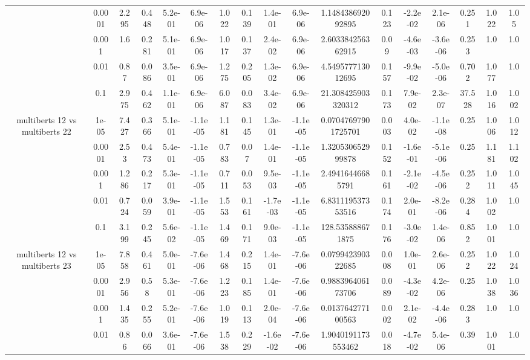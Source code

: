 \begin{tabular}{|c|c|c|c|c|c|c|c|c|c|c|c|c|c|c|c|c|}
 & 0.0001 & 2.295 & 0.448 & 5.2e-01 & 6.9e-06 & 1.022 & 0.139 & 1.4e-01 & 6.9e-06 & 1.148438692092895 & 0.123 & -2.2e-02 & 2.1e-06 & 0.251 & 1.022 & 1.05 \\
 & 0.001 & 1.6 & 0.281 & 5.1e-01 & 6.9e-06 & 1.017 & 0.137 & 2.4e-02 & 6.9e-06 & 2.603384256362915 & 0.09 & -4.6e-03 & -3.6e-06 & 0.253 & 1.0 & 1.0 \\
 & 0.01 & 0.87 & 0.086 & 3.5e-01 & 6.9e-06 & 1.275 & 0.205 & 1.3e-02 & 6.9e-06 & 4.549577713012695 & 0.157 & -9.9e-02 & -5.0e-06 & 0.702 & 1.077 & 1.0 \\
 & 0.1 & 2.975 & 0.462 & 1.1e-01 & 6.9e-06 & 6.087 & 0.083 & 3.4e-02 & 6.9e-06 & 21.308425903320312 & 0.173 & 7.9e-02 & 2.3e-07 & 37.528 & 1.016 & 1.002 \\
\hline
\multirow{5}{*}{multiberts 12 vs multiberts 22} & 1e-05 & 7.427 & 0.366 & 5.1e-01 & -1.1e-05 & 1.181 & 0.145 & 1.3e-01 & -1.1e-05 & 0.07047697901725701 & 0.003 & 4.0e-02 & -1.1e-08 & 0.25 & 1.006 & 1.012 \\
 & 0.0001 & 2.53 & 0.473 & 5.4e-01 & -1.1e-05 & 0.783 & 0.07 & 1.4e-01 & -1.1e-05 & 1.320530652999878 & 0.152 & -1.6e-01 & -5.1e-06 & 0.25 & 1.181 & 1.102 \\
 & 0.001 & 1.286 & 0.217 & 5.3e-01 & -1.1e-05 & 0.711 & 0.053 & 9.5e-03 & -1.1e-05 & 2.49416446685791 & 0.161 & -2.1e-02 & -4.5e-06 & 0.252 & 1.011 & 1.045 \\
 & 0.01 & 0.724 & 0.059 & 3.9e-01 & -1.1e-05 & 1.553 & 0.161 & -1.7e-03 & -1.1e-05 & 6.831119537353516 & 0.174 & 2.0e-01 & -8.2e-06 & 0.284 & 1.002 & 1.0 \\
 & 0.1 & 3.199 & 0.245 & 5.6e-02 & -1.1e-05 & 1.469 & 0.171 & 9.0e-03 & -1.1e-05 & 128.535888671875 & 0.176 & -3.0e-02 & 1.4e-06 & 0.852 & 1.001 & 1.0 \\
\hline
\multirow{5}{*}{multiberts 12 vs multiberts 23} & 1e-05 & 7.858 & 0.461 & 5.0e-01 & -7.6e-06 & 1.468 & 0.215 & 1.4e-01 & -7.6e-06 & 0.079942390322685 & 0.008 & 1.0e-01 & 2.6e-06 & 0.252 & 1.022 & 1.024 \\
 & 0.0001 & 2.956 & 0.58 & 5.3e-01 & -7.6e-06 & 1.223 & 0.185 & 1.4e-01 & -7.6e-06 & 0.988396406173706 & 0.089 & -4.3e-02 & 4.2e-06 & 0.25 & 1.038 & 1.036 \\
 & 0.001 & 1.435 & 0.255 & 5.2e-01 & -7.6e-06 & 1.019 & 0.113 & 2.0e-04 & -7.6e-06 & 0.013764277100563 & 0.002 & 2.1e-02 & -4.4e-06 & 0.283 & 1.0 & 1.0 \\
 & 0.01 & 0.86 & 0.066 & 3.6e-01 & -7.6e-06 & 1.538 & 0.229 & -1.6e-02 & -7.6e-06 & 1.9040191173553462 & 0.018 & -4.7e-02 & 5.4e-06 & 0.39 & 1.001 & 1.0 \\

\end{tabular}
